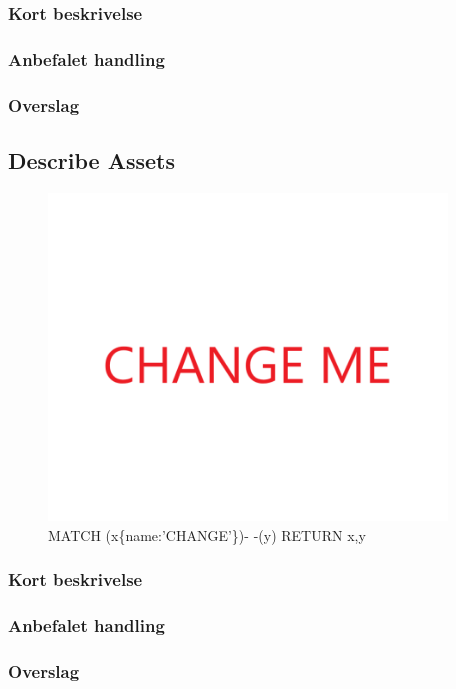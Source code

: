\documentclass{article}
\begin{document}
\subsubsection{Kort beskrivelse}
\subsubsection{Anbefalet handling}
\subsubsection{Overslag}
\subsection{Describe Assets}
\begin{figure}[h]
\includegraphics[width=300pt]{CHANGE.PNG}
\caption{MATCH (x\{name:'CHANGE'\})- -(y) RETURN x,y}
\end{figure}
\subsubsection{Kort beskrivelse}
\subsubsection{Anbefalet handling}
\subsubsection{Overslag}
\end{document}
